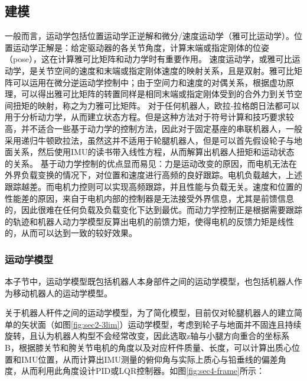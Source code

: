 \subsection{建模}
一般而言，运动学包括位置运动学正逆解和微分/速度运动学\cite{corke2011robotics}\cite{lynch2017modern}（雅可比运动学）。位置运动学正解是：给定驱动器的各关节角度，计算末端或指定刚体的位姿（pose），这在计算雅可比矩阵和动力学时有重要作用。
速度运动学，或雅可比运动学，是关节空间的速度和末端或指定刚体速度的映射关系，且是双射。雅可比矩阵可以运用在微分逆运动学控制中；由于空间力和速度的对偶关系，根据虚功原理，可以得出雅可比矩阵的转置同样是相同末端或指定刚体受到的合外力到关节空间扭矩的映射，称之为力雅可比矩阵。
对于任何机器人，欧拉-拉格朗日法都可以用于分析动力学，从而建立状态方程。但是这种方法对于符号计算和技巧要求较高，并不适合一些基于动力学的控制方法，因此对于固定基座的串联机器人，一般采用递归牛顿欧拉法，虽然这并不适用于轮腿机器人，但是可以首先假设轮子与地面关系，然后使用IMU的读书带入线性方程，从而解算出机器人扭矩和运动状态的关系。
基于动力学控制的优点显而易见：力是运动改变的原因，而电机无法在外界负载变换的情况下，对位置和速度进行高频的良好跟踪。电机负载越大，上述跟踪越差。而电机力控则可以实现高频跟踪，并且性能与负载无关。速度和位置的性能差的原因，来自于电机内部的控制器是无法接受外界信息，尤其是前馈信息的，因此很难在任何负载及负载变化下达到最优。而动力学控制正是根据需要跟踪的轨迹和机器人动力学模型反算出电机的前馈力矩，使得电机的反馈力矩是线性的，从而可以达到一致的较好效果。

\subsubsection{运动学模型}

本子节中，运动学模型既包括机器人本身部件之间的运动学模型，也包括机器人作为移动机器人的运动学模型。

关于机器人杆件之间的运动学模型，为了简化模型，目前仅对轮腿机器人的建立简单的矢状面（如图\ref{fig:sec2-3lim}）运动学模型，考虑到轮子与地面并不固连且持续旋转，且认为机器人构型不会经常改变，因此选取z轴与小腿方向重合的坐标系B，根据膝关节和胯关节电机的角度以及对应杆件质量、长度，可以计算出质心位置和IMU位置，从而计算出IMU测量的俯仰角与实际上质心与铅垂线的偏差角度，从而利用此角度设计PID或LQR控制器。如图\ref{fig:sec4-frame}所示：

